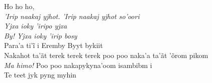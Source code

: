 \bigskip

\begin{linenumbers}\begingroup\raggedright

\noindent   Ho ho ho,\\
  \emph{'Irip naakaj yjhot. 'Irip naakaj yjhot so'oori}\\
  \emph{Yjxa ioky 'iripo yjxa}\\
  \emph{By! Yjxa ioky 'irip bosy}\\
  Para’a ti’ĩ i Eremby Byyt bykiit\\
  Nakahot ta'ãt terek terek terek poo poo naka'a ta'ãt 'õrom pikom\\
  \emph{Ma himo!} Poo poo nakapykyna'oom isambibm i\\
  Te teet jyk pyng myhin

\end{linenumbers}\endgroup

\bigskip

